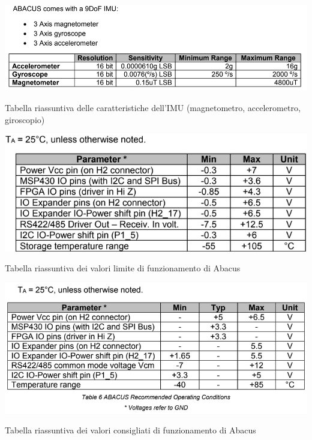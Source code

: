 \documentclass[LaM,binding=0.6cm]{../sapthesis}
\begin{document}
    \begin{table}[htbp]
    \centerline{\includegraphics[scale=.7]{examples/datasheet/abacusDatasheet3.PNG}}
    \caption{Tabella riassuntiva delle caratteristiche dell'IMU 
    (magnetometro, accelerometro,  giroscopio)}
    \label{fig}
    \end{table}

    \begin{table}[htbp]
    \centerline{\includegraphics[scale=.8]{examples/datasheet/abacusDatasheet4.PNG}}
    \caption{Tabella riassuntiva dei valori limite di funzionamento di Abacus}
    \label{fig}
    \end{table}
    
    \begin{table}[htbp]
    \centerline{\includegraphics[scale=.8]{examples/datasheet/abacusDatasheet5.PNG}}
    \caption{Tabella riassuntiva dei valori consigliati di funzionamento di Abacus}
    \label{fig}
    \end{table}
    
\end{document}
